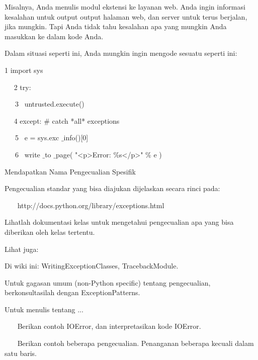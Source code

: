 Misalnya, Anda menulis modul ekstensi ke layanan web. Anda ingin informasi kesalahan untuk output output halaman web, dan server untuk terus berjalan, jika mungkin. Tapi Anda tidak tahu kesalahan apa yang mungkin Anda masukkan ke dalam kode Anda. \par
\vspace{12pt}
Dalam situasi seperti ini, Anda mungkin ingin mengode sesuatu seperti ini: \par
\vspace{12pt}
 1 import sys \par
~~ 2 try: \par
~~~3~  untrusted.execute() \par
~~ 4 except:  $  \#  $ catch *all* exceptions \par
~~~5~  e = sys.exc $  \_  $info()[0] \par
~~~6~  write $  \_  $to $  \_  $page( "<p>Error:  $  \%  $s</p>"  $  \%  $ e ) \par
\vspace{12pt}
Mendapatkan Nama Pengecualian Spesifik \par
\vspace{12pt}
Pengecualian standar yang bisa diajukan dijelaskan secara rinci pada: \par
\vspace{12pt}
~~~ http://docs.python.org/library/exceptions.html \par
\vspace{12pt}
Lihatlah dokumentasi kelas untuk mengetahui pengecualian apa yang bisa diberikan oleh kelas tertentu. \par
\vspace{12pt}
Lihat juga: \par
\vspace{12pt}
Di wiki ini: WritingExceptionClasses, TracebackModule. \par
\vspace{12pt}
Untuk gagasan umum (non-Python specific) tentang pengecualian, berkonsultasilah dengan ExceptionPatterns. \par
\vspace{12pt}
Untuk menulis tentang ... \par
\vspace{12pt}
~~~ Berikan contoh IOError, dan interpretasikan kode IOError. \par
~~~ Berikan contoh beberapa pengecualian. Penanganan beberapa kecuali dalam satu baris. \par
\vspace{12pt}

